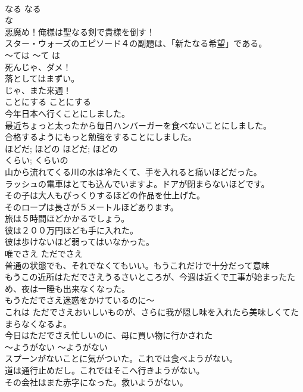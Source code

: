 \documentclass[8pt]{extreport}
\begin{document}
\begin{CJK}{UTF8}{min}
\\	なる	なる	
\\	な 
\\	悪魔め！俺様は聖なる剣で貴様を倒す！  
\\	スター・ウォーズのエピソード４の副題は、「新たなる希望」である。  
\\	〜ては	〜て は	
\\	死んじゃ、ダメ！  
\\	落としてはまずい。  
\\	じゃ、また来週！  
\\	ことにする	ことにする	
\\	今年日本へ行くことにしました。	
\\	最近ちょっと太ったから毎日ハンバーガーを食べないことにしました。  
\\	合格するようにもっと勉強をすることにしました。  
\\	ほどだ; ほどの	ほどだ; ほどの	
\\	くらい; くらいの	
\\	山から流れてくる川の水は冷たくて、手を入れると痛いほどだった。  
\\	ラッシュの電車はとても込んでいますよ。ドアが閉まらないほどです。  
\\	その子は大人もびっくりするほどの作品を仕上げた。  
\\	そのロープは長さが５メートルほどあります。  
\\	旅は５時間ほどかかるでしょう。  
\\	彼は２００万円ほども手に入れた。  
\\	彼は歩けないほど弱ってはいなかった。  
\\	唯でさえ	ただでさえ	
\\	普通の状態でも、それでなくてもいい。もうこれだけで十分だって意味	
\\	もうこの近所はただでさえうるさいところが、今週は近くで工事が始まったため、夜は一睡も出来なくなった。  
\\	もうただでさえ迷惑をかけているのに〜  
\\	これは ただでさえおいしいものが、さらに我が隠し味を入れたら美味しくてたまらなくなるよ。  
\\	今日はただでさえ忙しいのに、母に買い物に行かされた  
\\	〜ようがない	〜ようがない	
\\	スプーンがないことに気がついた。これでは食べようがない。  
\\	道は通行止めだし。これではそこへ行きようがない。  
\\	その会社はまた赤字になった。救いようがない。   

\end{CJK}
\end{document}

